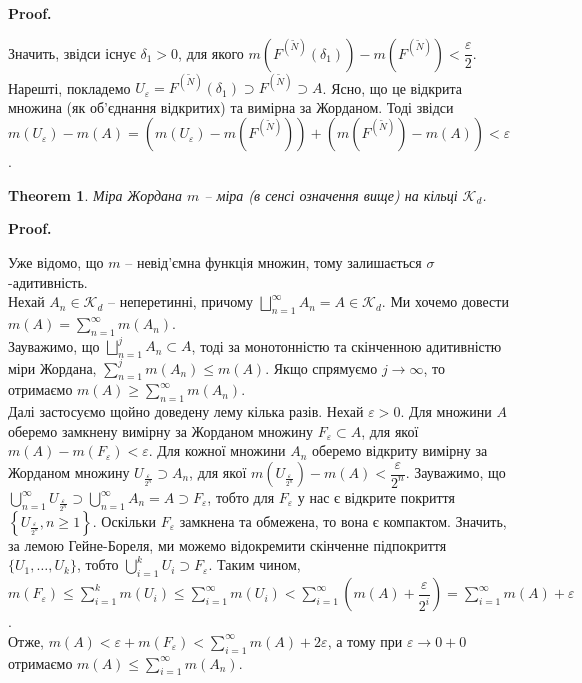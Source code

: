 \documentclass[a4paper, 10pt]{article}
\makeatletter
\theoremstyle{theoremdd}
\newtheorem{theorem}{Theorem}[subsection]
\renewenvironment{proof}[1][Proof.\\]{\par
\pushQED{\hfill \qed}%
\normalfont \topsep6\p@\@plus6\p@\relax
\trivlist
\item\relax
{\bfseries
#1\@addpunct{.}}\hspace\labelsep\ignorespaces
}{%
\popQED\endtrivlist\@endpefalse
}
\makeatother
\begin{document}
\begin{proof}
Значить, звідси існує $\delta_1 > 0$, для якого $m(F^{(\tilde{N})}(\delta_1)) - m(F^{(\tilde{N})}) < \dfrac{\varepsilon}{2}$.\\
Нарешті, покладемо $U_\varepsilon = F^{(\tilde{N})}(\delta_1) \supset F^{(\tilde{N})} \supset A$. Ясно, що це відкрита множина (як об'єднання відкритих) та вимірна за Жорданом. Тоді звідси\\
$m(U_\varepsilon) - m(A) = (m(U_\varepsilon) - m(F^{(\tilde{N})})) + (m(F^{(\tilde{N})}) - m(A)) < \varepsilon$.
\end{proof}

\begin{theorem}
Міра Жордана $m$ -- міра (в сенсі означення вище) на кільці $\mathcal{K}_d$.
\end{theorem}

\begin{proof}
Уже відомо, що $m$ -- невід'ємна функція множин, тому залишається $\sigma$-адитивність.\\
Нехай $A_n \in \mathcal{K}_d$ -- неперетинні, причому $\displaystyle\bigsqcup_{n=1}^\infty A_n = A \in \mathcal{K}_d$. Ми хочемо довести $m(A) = \displaystyle\sum_{n=1}^\infty m(A_n)$.\\
Зауважимо, що $\displaystyle\bigsqcup_{n=1}^j A_n \subset A$, тоді за монотонністю та скінченною адитивністю міри Жордана, $\displaystyle\sum_{n=1}^j m(A_n) \leq m(A)$. Якщо спрямуємо $j \to \infty$, то отримаємо $m(A) \geq \displaystyle\sum_{n=1}^\infty m(A_n)$.\\
Далі застосуємо щойно доведену лему кілька разів. Нехай $\varepsilon > 0$. Для множини $A$ оберемо замкнену вимірну за Жорданом множину $F_\varepsilon \subset A$, для якої $m(A) - m(F_\varepsilon) < \varepsilon$. Для кожної множини $A_n$ оберемо відкриту вимірну за Жорданом множину $U_{\frac{\varepsilon}{2^n}} \supset A_n$, для якої $m(U_{\frac{\varepsilon}{2^n}}) - m(A) < \dfrac{\varepsilon}{2^n}$. Зауважимо, що $\displaystyle\bigcup_{n=1}^\infty U_{\frac{\varepsilon}{2^n}} \supset \bigcup_{n=1}^\infty A_n = A \supset F_\varepsilon$, тобто для $F_\varepsilon$ у нас є відкрите покриття $\left\{ U_{\frac{\varepsilon}{2^n}}, n \geq 1\right\}$. Оскільки $F_\varepsilon$ замкнена та обмежена, то вона є компактом. Значить, за лемою Гейне-Бореля, ми можемо відокремити скінченне підпокриття $\{U_1,\dots,U_k\}$, тобто $\displaystyle\bigcup_{i=1}^k U_i \supset F_\varepsilon$. Таким чином,\\
$m(F_\varepsilon) \leq \displaystyle\sum_{i=1}^k m(U_i) \leq \sum_{i=1}^\infty m(U_i) < \sum_{i=1}^\infty \left(m(A) + \dfrac{\varepsilon}{2^i} \right) = \sum_{i=1}^\infty m(A) + \varepsilon$.\\
Отже, $\displaystyle m(A) < \varepsilon + m(F_\varepsilon) < \sum_{i=1}^\infty m(A) + 2 \varepsilon$, а тому при $\varepsilon \to 0+0$ отримаємо $m(A) \leq \displaystyle\sum_{i=1}^\infty m(A_n)$.
\end{proof}
\end{document}

